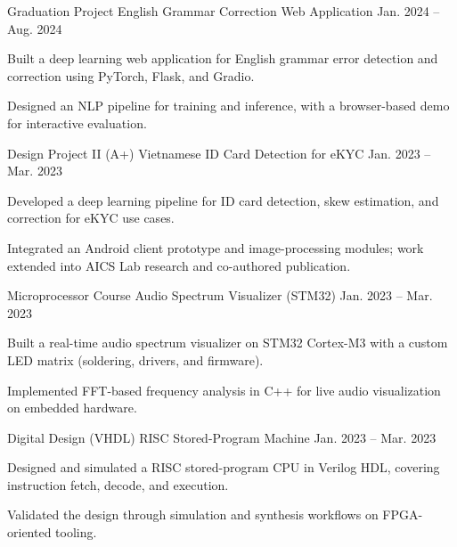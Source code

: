 
\begin{cventries}
  \cventry
  {Graduation Project} %
  {English Grammar Correction Web Application} %
  {} %
  {Jan. 2024 -- Aug. 2024} %
  {
    \begin{cvitems}
      \item {Built a deep learning web application for English grammar error detection and correction using PyTorch, Flask, and Gradio.}
      \item {Designed an NLP pipeline for training and inference, with a browser-based demo for interactive evaluation.}
    \end{cvitems}
  }

  \cventry
  {Design Project II (A+)} %
  {Vietnamese ID Card Detection for eKYC} %
  {} %
  {Jan. 2023 -- Mar. 2023} %
  {
    \begin{cvitems}
      \item {Developed a deep learning pipeline for ID card detection, skew estimation, and correction for eKYC use cases.}
      \item {Integrated an Android client prototype and image-processing modules; work extended into AICS Lab research and co-authored publication.}
    \end{cvitems}
  }

  \cventry
  {Microprocessor Course} %
  {Audio Spectrum Visualizer (STM32)} %
  {} %
  {Jan. 2023 -- Mar. 2023} %
  {
    \begin{cvitems}
      \item {Built a real-time audio spectrum visualizer on STM32 Cortex-M3 with a custom LED matrix (soldering, drivers, and firmware).}
      \item {Implemented FFT-based frequency analysis in C++ for live audio visualization on embedded hardware.}
    \end{cvitems}
  }

  \cventry
  {Digital Design (VHDL)} %
  {RISC Stored-Program Machine} %
  {} %
  {Jan. 2023 -- Mar. 2023} %
  {
    \begin{cvitems}
      \item {Designed and simulated a RISC stored-program CPU in Verilog HDL, covering instruction fetch, decode, and execution.}
      \item {Validated the design through simulation and synthesis workflows on FPGA-oriented tooling.}
    \end{cvitems}
  }
\end{cventries}
